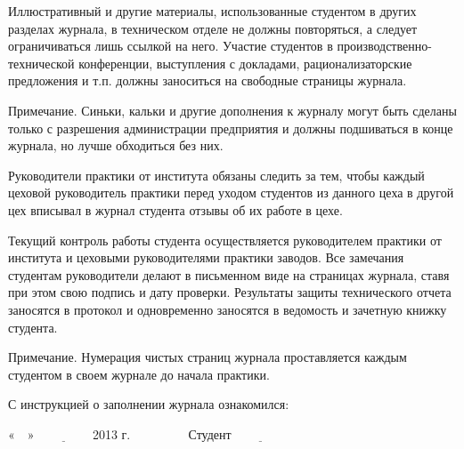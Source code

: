 Иллюстративный и другие материалы, использованные студентом в других разделах журнала, в техническом отделе не должны повторяться, а следует  ограничиваться лишь ссылкой на него. Участие студентов в производственно-технической конференции, выступления с докладами, рационализаторские предложения и т.п. должны заноситься на свободные страницы журнала.


Примечание. Синьки, кальки и другие дополнения к журналу могут быть сделаны только с разрешения администрации предприятия и должны подшиваться в конце журнала, но лучше обходиться без них.

Руководители практики от института обязаны следить за тем, чтобы каждый цеховой руководитель практики перед уходом студентов из данного цеха в другой цех вписывал в журнал студента  отзывы об их работе в цехе.

Текущий контроль работы студента осуществляется руководителем практики от института и цеховыми руководителями практики заводов. Все замечания студентам руководители делают в письменном виде на страницах журнала, ставя при этом свою подпись и дату проверки. Результаты защиты технического отчета заносятся в протокол и одновременно заносятся в ведомость и зачетную книжку студента.

Примечание. Нумерация чистых страниц журнала проставляется каждым студентом в своем журнале до начала практики.
 

С инструкцией о заполнении журнала ознакомился:

\vspace{1em}

«$\quad$» $\underline{\qquad \qquad}$ 2013 г.	$\qquad \qquad$			Студент $\underline{\qquad \qquad}$